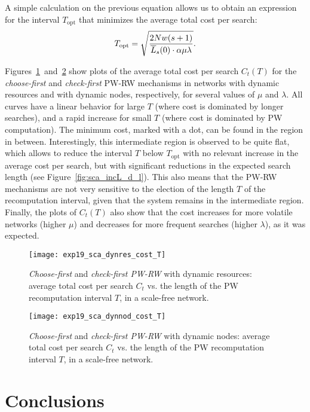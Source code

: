 \documentclass[]{elsarticle}
\begin{document}
A simple calculation on the previous equation allows us to obtain an expression for the interval $T_{\mathrm{opt}}$ that minimizes the average total cost per search:
\begin{equation}
 T_{\mathrm{opt}} = \sqrt{\frac{2Nw(s+1)}{\overline{L}_s(0)\cdot \alpha\mu\lambda}}.
 \label{eq:Topt}
\end{equation}

Figures~\ref{fig:sca_dynres_cost_T}~and~\ref{fig:sca_dynnod_cost_T} show plots of the average total cost per search $C_t(T)$ for the \emph{choose-first} and \emph{check-first} PW-RW mechanisms in networks with dynamic resources and with dynamic nodes, respectively, for several values of $\mu$ and $\lambda$. All curves have a linear behavior for large $T$ (where cost is dominated by longer searches), and a rapid increase for small $T$ (where cost is dominated by PW computation). The minimum cost, marked with a dot, can be found in the region in between. Interestingly, this intermediate region is observed to be quite flat, which allows to reduce the interval $T$ below $T_\mathrm{opt}$ with no relevant increase in the average cost per search, but with significant reductions in the expected search length (see Figure~\ref{fig:sca_incL_d_l}). This also means that the PW-RW mechanisms are not very sensitive to the election of the length $T$ of the recomputation interval, given that the system remains in the intermediate region. Finally, the plots of $C_t(T)$ also show that the cost increases for more volatile networks (higher $\mu$) and decreases for more frequent searches (higher $\lambda$), as it was expected.

\begin{figure}
 \centering
 \texttt{[image: exp19\_sca\_dynres\_cost\_T]}
 \caption{\emph{Choose-first} and \emph{check-first PW-RW} with dynamic resources: average total cost per search $C_t$ vs. the length of the PW recomputation interval $T$, in a scale-free network.}
 \label{fig:sca_dynres_cost_T}
\end{figure}

\begin{figure}
 \centering
 \texttt{[image: exp19\_sca\_dynnod\_cost\_T]}
 \caption{\emph{Choose-first} and \emph{check-first PW-RW} with dynamic nodes: average total cost per search $C_t$ vs. the length of the PW recomputation interval $T$, in a scale-free network.}
 \label{fig:sca_dynnod_cost_T}
\end{figure}


\section{Conclusions}
\label{sec:conclusions}
\end{document}
